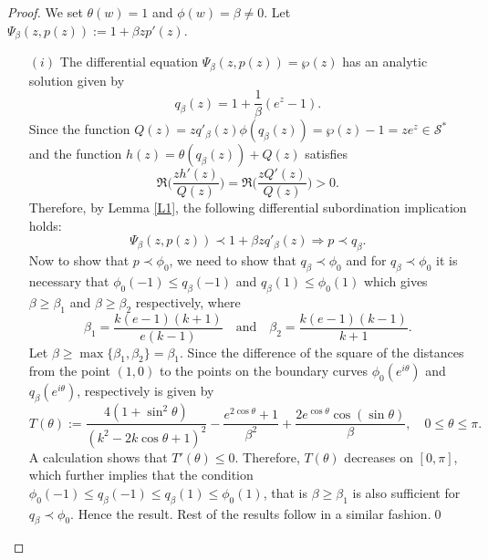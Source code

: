 \documentclass[12pt, reqno]{amsart}
\numberwithin{equation}{section}
\theoremstyle{plain}
\theoremstyle{definition}
\theoremstyle{remark}
\begin{document}
\begin{proof}
	We set $\theta(w)=1$ and $\phi(w)=\beta\neq0$. Let $\Psi_\beta(z, p(z)):= 1+\beta zp'(z)$.
	\begin{itemize}
		\item [$(i)$] The differential equation $\Psi_\beta(z, p(z))=\wp(z)$ has an analytic solution given by
		\begin{equation*}
		q_{\beta}(z)=1+\frac{1}{\beta}(e^z-1).
		\end{equation*}
		Since the function 
		$Q(z)=zq'_{\beta}(z)\phi(q_{\beta}(z))=\wp(z)-1=ze^z\in\mathcal{S}^{*}$ and the function	$h(z)=\theta(q_{\beta}(z))+Q(z)$ satisfies  
		$$\Re\biggl(\frac{zh'(z)}{Q(z)}\biggl)=\Re\biggl(\frac{zQ'(z)}{Q(z)}\biggl)>0.$$ 
		Therefore, by Lemma \ref{L1}, the following differential subordination implication holds:
		$$\Psi_\beta(z, p(z))\prec 1+\beta zq'_{\beta}(z)\Rightarrow p\prec q_{\beta}.$$
		Now to show that $p\prec \phi_0$, we need to show that $q_{\beta}\prec\phi_0$ and for $q_{\beta}\prec\phi_0$ it is necessary that $\phi_0(-1)\leq q_{\beta}(-1)$ and $q_{\beta}(1)\leq\phi_0(1)$ which gives $\beta\geq\beta_1$ and $\beta\geq\beta_2$ respectively, where
		$$\beta_1=\frac{k(e-1)(k+1)}{e(k-1)} \quad\text{and}\quad \beta_2=\frac{k(e-1)(k-1)}{k+1}.$$
		Let $\beta\geq\max\{\beta_1,\beta_2\}=\beta_1$. Since the difference of the square of the distances from the point $(1,0)$ to the points on the boundary curves  $\phi_0( e^{i\theta})$ and $q_{\beta}( e^{i\theta})$, respectively is given by
		$$T(\theta):= \frac{4(1+\sin^2{\theta})}{(k^2-2k\cos{\theta}+1)^2}-\frac{e^{2\cos{\theta}}+1}{{\beta}^2}+\frac{2e^{\cos{\theta}}\cos(\sin\theta)}{\beta},\quad 0\leq\theta\leq\pi.$$
		A calculation shows that $T'(\theta)\leq0$. Therefore, $T(\theta)$ decreases on $[0,\pi]$, which further implies that the condition $\phi_0(-1)\leq q_{\beta}(-1) \leq q_{\beta}(1)\leq\phi_0(1)$, that is $\beta\geq\beta_1$  is also sufficient for $q_{\beta}\prec\phi_0$. Hence the result. Rest of the results follow in a similar fashion.\qed
	\end{itemize}
\end{proof}
\end{document}

